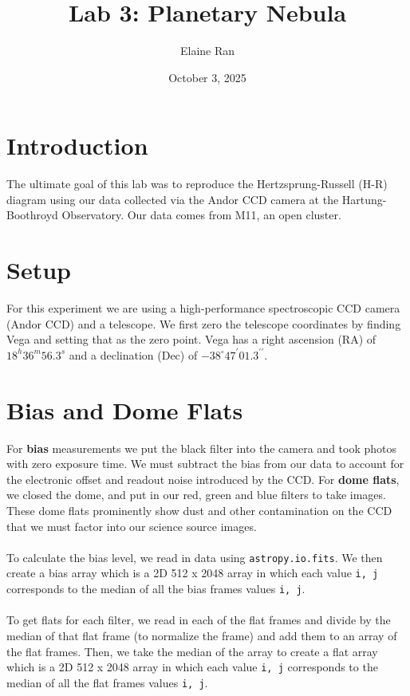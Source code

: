 \documentclass[twocolumn]{article}
\title{Lab 3: Planetary Nebula}
\author{Elaine Ran}
\date{October 3, 2025}
\begin{document}
\maketitle

\section{Introduction}
The ultimate goal of this lab was to reproduce the Hertzsprung-Russell (H-R) diagram using our data collected via the Andor CCD camera at the Hartung-Boothroyd Observatory. Our data comes from M11, an open cluster.

\section{Setup}
For this experiment we are using a high-performance spectroscopic CCD camera (Andor CCD) and a telescope. We first zero the telescope coordinates by finding Vega and setting that as the zero point. Vega has a right ascension (RA) of $18^h36^m56.3^s$ and a declination (Dec) of $-38^{\circ}47^{\prime}01.3^{\prime\prime}$. 

\section{Bias and Dome Flats}
For \textbf{bias} measurements we put the black filter into the camera and took photos with zero exposure time. We must subtract the bias from our data to account for the electronic offset and readout noise introduced by the CCD. For \textbf{dome flats}, we closed the dome, and put in our red, green and blue filters to take images. These dome flats prominently show dust and other contamination on the CCD that we must factor into our science source images. 
\\
\\
To calculate the bias level, we read in data using \verb|astropy.io.fits|. We then create a bias array which is a 2D 512 x 2048 array in which each value \verb|i, j| corresponds to the median of all the bias frames values \verb|i, j|. 
\\
\\
To get flats for each filter, we read in each of the flat frames and divide by the median of that flat frame (to normalize the frame) and add them to an array of the flat frames. Then, we take the median of the array to create a flat array which is a 2D 512 x 2048 array in which each value \verb|i, j| corresponds to the median of all the flat frames values \verb|i, j|. 
\end{document}
